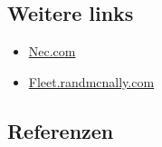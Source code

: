 \documentclass[
]{book}
\providecommand{\tightlist}{%
  \setlength{\itemsep}{0pt}\setlength{\parskip}{0pt}}
\begin{document}
\hypertarget{weitere-links-13}{%
\subsection*{Weitere links}\label{weitere-links-13}}

\begin{itemize}
\tightlist
\item
  \href{https://www.nec.com/en/global/solutions/transportation/task/fms_pis.html}{Nec.com}
\item
  \href{https://fleet.randmcnally.com/field-service/passenger-transit}{Fleet.randmcnally.com}
\end{itemize}

\hypertarget{referenzen-16}{%
\subsection*{Referenzen}\label{referenzen-16}}
\end{document}
